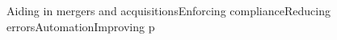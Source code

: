 \documentclass[preview]{standalone}
\begin{document}
\begin{center}
Aiding in mergers and acquisitionsEnforcing complianceReducing errorsAutomationImproving p
\end{center}
\end{document}

